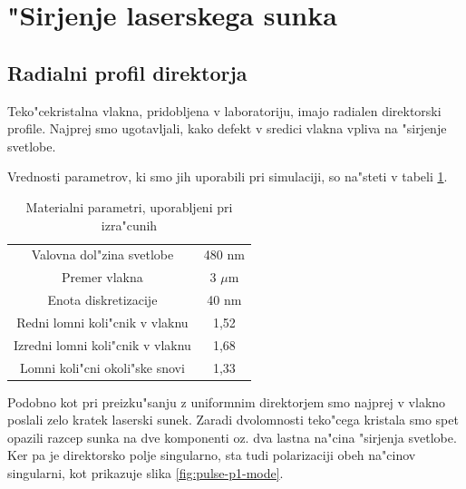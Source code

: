 \documentclass[a4paper,10pt]{article}
\begin{document}
\newpage
\section{"Sirjenje laserskega sunka}

\subsection{Radialni profil direktorja}

Teko"cekristalna vlakna, pridobljena v laboratoriju, imajo radialen direktorski profile. 
Najprej smo ugotavljali, kako defekt v sredici vlakna vpliva na "sirjenje svetlobe. 

Vrednosti parametrov, ki smo jih uporabili pri simulaciji, so na"steti v tabeli \ref{tab:parametri}. 

\begin{table}[!htbp]
\centering
 \begin{tabular}{|c|c|}
  \hline
  Valovna dol"zina svetlobe & 480 nm \\
  Premer vlakna & 3 $\mu$m \\
  Enota diskretizacije & 40 nm \\
  \hline
  Redni lomni koli"cnik v vlaknu & 1,52 \\
  Izredni lomni koli"cnik v vlaknu & 1,68 \\
  Lomni koli"cni okoli"ske snovi & 1,33 \\
  \hline
 \end{tabular}
 \caption{Materialni parametri, uporabljeni pri izra"cunih}
 \label{tab:parametri}
\end{table}

Podobno kot pri preizku"sanju z uniformnim direktorjem smo najprej v vlakno poslali zelo kratek laserski sunek. 
Zaradi dvolomnosti teko"cega kristala smo spet opazili razcep sunka na dve komponenti oz. dva lastna na"cina "sirjenja svetlobe. 
Ker pa je direktorsko polje singularno, sta tudi polarizaciji obeh na"cinov singularni, kot prikazuje slika \ref{fig:pulse-p1-mode}. 
\end{document}
